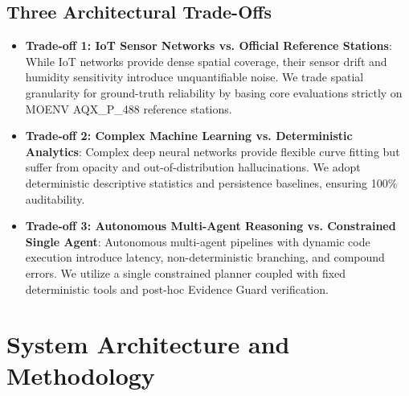 \documentclass[conference]{IEEEtran}
\begin{document}
\subsection{Three Architectural Trade-Offs}
\begin{itemize}
    \item \textbf{Trade-off 1: IoT Sensor Networks vs. Official Reference Stations}: While IoT networks provide dense spatial coverage, their sensor drift and humidity sensitivity introduce unquantifiable noise. We trade spatial granularity for ground-truth reliability by basing core evaluations strictly on MOENV AQX\_P\_488 reference stations.
    \item \textbf{Trade-off 2: Complex Machine Learning vs. Deterministic Analytics}: Complex deep neural networks provide flexible curve fitting but suffer from opacity and out-of-distribution hallucinations. We adopt deterministic descriptive statistics and persistence baselines, ensuring 100\% auditability.
    \item \textbf{Trade-off 3: Autonomous Multi-Agent Reasoning vs. Constrained Single Agent}: Autonomous multi-agent pipelines with dynamic code execution introduce latency, non-deterministic branching, and compound errors. We utilize a single constrained planner coupled with fixed deterministic tools and post-hoc Evidence Guard verification.
\end{itemize}

\section{System Architecture and Methodology}
\end{document}
